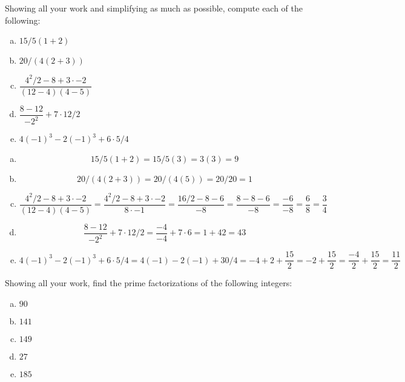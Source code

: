 \documentclass[11pt,letterpaper]{article}
\begin{document}

 Showing all your work and simplifying as much as possible, compute each of the following:
        \begin{enumerate}[(a)]
        \item $15/5(1 + 2)$
        \item $20/(4(2 + 3))$
        \item $\dfrac{4^2/2 - 8 + 3 \cdot -2}{(12 - 4)(4 - 5)}$
        \item $\dfrac{8 - 12}{-2^2} + 7 \cdot 12/2$
        \item $4(-1)^3 - 2(-1)^3 + 6 \cdot 5/4$
        \end{enumerate} \pspace

\sol 
\begin{enumerate}[(a)]
\item 
	\[
	15/5(1 + 2)= 15/5(3)= 3(3)= 9
	\] \pspace

\item 
	\[
	20/(4(2 + 3))= 20/(4(5))= 20/20= 1
	\] \pspace

\item 
	\[
	\dfrac{4^2/2 - 8 + 3 \cdot -2}{(12 - 4)(4 - 5)}= \dfrac{4^2/2 - 8 + 3 \cdot -2}{8 \cdot -1}= \dfrac{16/2 - 8 - 6}{-8}= \dfrac{8 - 8 - 6}{-8}= \dfrac{-6}{-8}= \dfrac{6}{8}= \dfrac{3}{4}
	\] \pspace

\item 
	\[
	\dfrac{8 - 12}{-2^2} + 7 \cdot 12/2= \dfrac{-4}{-4} + 7 \cdot 6= 1 + 42= 43
	\] \pspace

\item 
	\[
	4(-1)^3 - 2(-1)^3 + 6 \cdot 5/4= 4(-1) - 2(-1) + 30/4= -4 + 2 + \dfrac{15}{2}= -2 + \dfrac{15}{2}= \dfrac{-4}{2} + \dfrac{15}{2}= \dfrac{11}{2}
	\]
\end{enumerate}



\newpage



 Showing all your work, find the prime factorizations of the following integers:
        \begin{enumerate}[(a)]
        \item $90$
        \item $141$
        \item $149$
        \item $27$
        \item $185$
        \end{enumerate} \pspace
\end{document}

